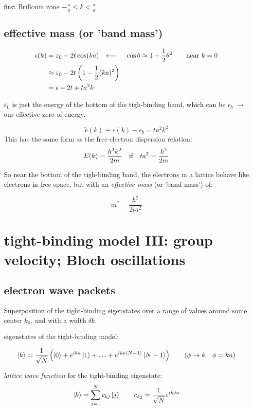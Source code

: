 \documentclass[10pt, a4paper, twocolumn]{article}
\newcommand{\arr}{\ensuremath{\longrightarrow\ }}
\newcommand{\larr}{\ensuremath{\longleftarrow\ }}
\newcommand{\eps}{\ensuremath{\varepsilon _0}}
\begin{document}
first Brillouin zone \qq{\arr}
$\displaystyle -\frac{\pi}{a}\leq k<\frac{\pi}{a} $

\subsection{effective mass (or 'band mass')}

\begin{equation*}
\begin{aligned}
\epsilon (k) &= \eps - 2t\cos (ka)
\qq{\larr} \cos\theta\approx 1-\frac12 \theta ^2
\qquad \text{near } k=0
\\&\approx \eps - 2t \left(1-\frac12 (ka)^2 \right)
\\&= \epsilon - 2t +ta^2k
\end{aligned}
\end{equation*}

$\eps$ is just the energy of the bottom of the tigh-binding band, which can be $\epsilon _b$ \arr our effective zero of energy.

\[\tilde e (k) \equiv \epsilon (k)-\epsilon _b = ta^2k^2 \]
This has the same form as the free-electron dispersion relation:
\[E(k)=\frac{\hbar^2k^2}{2m} \qq{if} ta^2
= \frac{\hbar^2}{2m}\]

So near the bottom of the tigh-binding band, the electrons in a lattice behave like electrons in free space, but with an \emph{effective mass} (or 'band mass') of:

\[m^* = \frac{\hbar^2}{2ta^2} \]

\section{tight-binding model III: group velocity; Bloch oscillations}

\subsection{electron wave packets}
Superposition of the tight-binding eigenstates over a range of values around some center $k_0$, and with a width $\delta k$.

eigenstates of the tight-binding model:

\[ \ket k = \frac{1}{\sqrt N}
\left( \ket 0 + e^{ika}\ket 1 + \ldots
+ e^{ika(N-1)} \ket{N-1} \right)
\qquad (\phi \rightarrow k\quad \phi = ka)
\]

\emph{lattice wave function} for the tight-binding eigenstate:
\[ \ket k = \sum _{j=1}^N c_{kj} \ket j
\qquad c_{kj} = \frac{1}{\sqrt N} e^{ikja} \]
\end{document}
